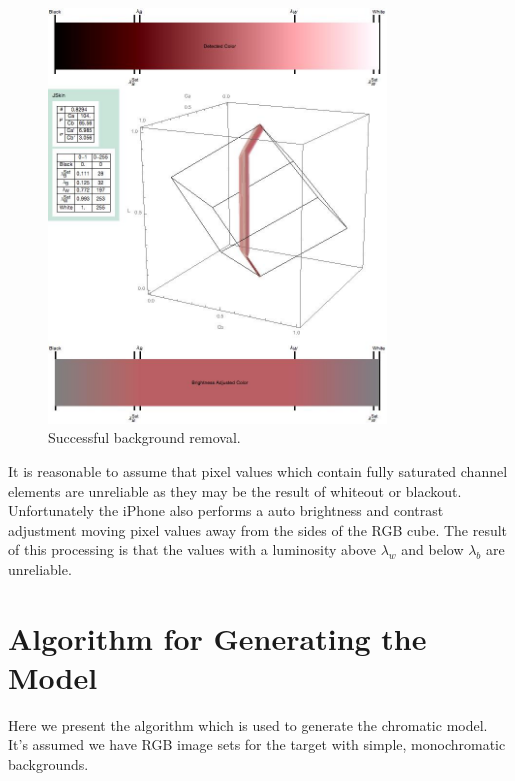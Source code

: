 \begin{figure}[h!]
  \centering
    \includegraphics[width=0.80\textwidth]{Chapter3/Figs/WOBOFig.jpg}
    \caption{Successful background removal.}  \label{fig:BGSuccess}
\end{figure}

It is reasonable to assume that pixel values which contain fully saturated channel elements are unreliable as they may be the result of whiteout or blackout. Unfortunately the iPhone also performs a auto brightness and contrast adjustment moving pixel values away from the sides of the RGB cube. The result of this processing is that the values with a luminosity above $\lambda_w$ and below $\lambda_b$ are unreliable.

\section{Algorithm for Generating the Model}\label{sec:AlgorithmForGeneratingModel}
Here we present the algorithm which is used to generate the chromatic model. It's assumed we have RGB image sets for the target with simple, monochromatic backgrounds.



